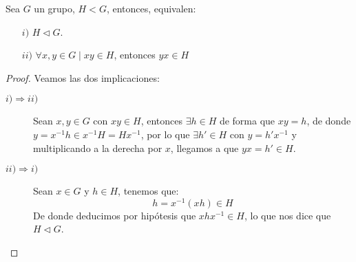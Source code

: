 \begin{prop}
    Sea $G$ un grupo, $H<G$, entonces, equivalen:
    \begin{enumerate}
        \item[$i)$] $H\lhd G$.
        \item[$ii)$] $\forall x,y\in G \mid xy \in H$, entonces $yx \in H$
    \end{enumerate}
    \begin{proof}
        Veamos las dos implicaciones:
        \begin{description}
            \item [$i)\Longrightarrow ii)$] Sean $x,y\in G$ con $xy\in H$, entonces $\exists h\in H$ de forma que $xy = h$, de donde $y = x^{-1}h \in x^{-1}H = Hx^{-1}$, por lo que $\exists h'\in H$ con $y = h'x^{-1}$ y multiplicando a la derecha por $x$, llegamos a que $yx = h' \in H$.
            \item [$ii)\Longrightarrow i)$] Sean $x\in G$ y $h\in H$, tenemos que:
                \begin{equation*}
                    h = x^{-1}(xh) \in H
                \end{equation*}
                De donde deducimos por hipótesis que $xhx^{-1} \in H$, lo que nos dice que $H\lhd G$.
        \end{description}
    \end{proof}
\end{prop}


